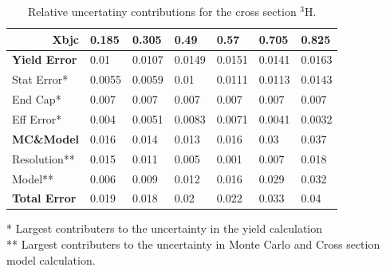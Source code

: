 \documentclass[12pt,usenames,dvipsnames]{beamer}
\begin{document}
\begin{frame}{}

\begin{table}[]
\caption*{Relative uncertatiny contributions for the cross section $^3$H.}
\begin{tabular}{|p{2.2cm}|l|l|l|l|l|l|}
\hline
\multicolumn{1}{|r|}{\textbf{Xbjc}} & \textbf{0.185} & \textbf{0.305} & \textbf{0.49} & \textbf{0.57} & \textbf{0.705} & \textbf{0.825} \\ \hline
\textbf{Yield Error}                & 0.01           & 0.0107         & 0.0149        & 0.0151        & 0.0141         & 0.0163         \\ \hline
Stat Error*                         & 0.0055         & 0.0059         & 0.01          & 0.0111        & 0.0113         & 0.0143         \\ \hline
End Cap*                            & 0.007          & 0.007          & 0.007         & 0.007         & 0.007          & 0.007          \\ \hline
Eff Error*                          & 0.004          & 0.0051         & 0.0083        & 0.0071        & 0.0041         & 0.0032         \\ \hline\hline
\textbf{MC\&Model}                  & 0.016          & 0.014          & 0.013         & 0.016         & 0.03           & 0.037          \\ \hline
Resolution**                        & 0.015          & 0.011          & 0.005         & 0.001         & 0.007          & 0.018          \\ \hline
Model**                             & 0.006          & 0.009          & 0.012         & 0.016         & 0.029          & 0.032          \\ \hline\hline
\textbf{Total Error}                & 0.019          & 0.018          & 0.02          & 0.022         & 0.033          & 0.04           \\ \hline
\end{tabular}

* Largest contributers to the uncertainty in the yield calculation\\
** Largest contributers to the uncertainty in Monte Carlo and Cross section model calculation. 

\end{table}
\end{frame}
\end{document}
